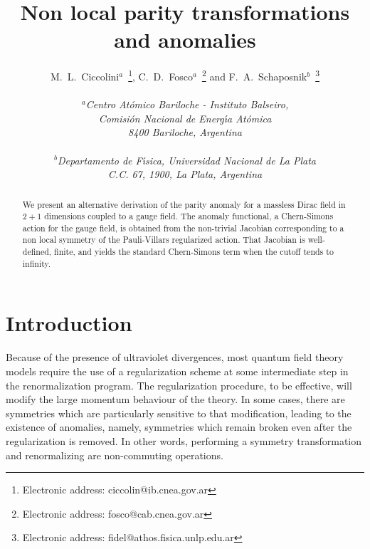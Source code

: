 \documentclass[a4paper,12pt]{article}
\begin{document}
\title{Non local parity transformations and anomalies}
\author{M.~L.~Ciccolini$^a$~\footnote{Electronic address:
    ciccolin@ib.cnea.gov.ar}, C.~D.~Fosco$^a$~\footnote{Electronic
    address: fosco@cab.cnea.gov.ar} and
  F.~A.~Schaposnik$^b$~\footnote{Electronic address:
    fidel@athos.fisica.unlp.edu.ar}\\ \\
{\normalsize\it $^a$Centro At\' omico Bariloche - Instituto Balseiro,}\\ 
{\normalsize\it Comisi\'on Nacional de Energ\'{\i}a At\'omica}\\
{\normalsize\it 8400 Bariloche, Argentina}\\ \\
{\normalsize\it $^b$Departamento de F\'\i sica, Universidad Nacional
    de La Plata}\\
  {\normalsize\it C.C. 67, 1900, La Plata, Argentina} } \date{\hfill}
\maketitle
\begin{abstract}
\noindent
We present an alternative derivation of the parity anomaly for a
massless Dirac field in $2+1$ dimensions coupled to a gauge field. The
anomaly functional, a Chern-Simons action for the gauge field, is
obtained from the non-trivial Jacobian corresponding to a non local
symmetry of the Pauli-Villars regularized action. That Jacobian is
well-defined, finite, and yields the standard Chern-Simons term when
the cutoff tends to infinity.
\end{abstract}
\bigskip

\section{Introduction}
Because of the presence of ultraviolet divergences, most quantum field
theory models require the use of a regularization scheme at some
intermediate step in the renormalization program. The regularization
procedure, to be effective, will modify the large momentum behaviour
of the theory. In some cases, there are symmetries which are
particularly sensitive to that modification, leading to the existence
of anomalies, namely, symmetries which remain broken even after the
regularization is removed. In other words, performing a symmetry
transformation and renormalizing are non-commuting operations.
\end{document}
